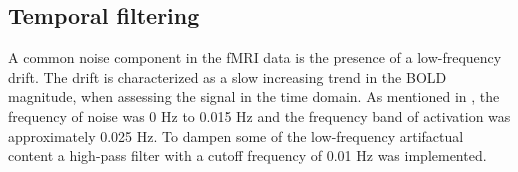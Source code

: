 \subsection{Temporal filtering}

A common noise component in the fMRI data is the presence of a low-frequency drift. The drift is characterized as a slow increasing trend in the BOLD magnitude, when assessing the signal in the time domain. As mentioned in , the frequency of noise was 0 Hz to 0.015 Hz and the frequency band of activation was approximately 0.025 Hz. To dampen some of the low-frequency artifactual content a high-pass filter with a cutoff frequency of 0.01 Hz was implemented. \cite{FMRIB2018} \\


 
 
 
 
 
